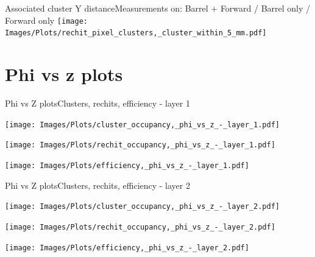 \documentclass{beamer}
\begin{document}
\begin{frame}{Associated cluster Y distance}{Measurements on: Barrel + Forward / Barrel only / Forward only}
  \centering
  \texttt{[image: Images/Plots/rechit\_pixel\_clusters,\_cluster\_within\_5\_mm.pdf]}
\end{frame}

\section{Phi vs z plots}

\begin{frame}{Phi vs Z plots}{Clusters, rechits, efficiency - layer 1}
  \hspace{0.01\textwidth}%
  \begin{minipage}{0.32\textwidth}
    \centering
    \texttt{[image: Images/Plots/cluster\_occupancy,\_phi\_vs\_z\_-\_layer\_1.pdf]}
  \end{minipage}%
  \hspace{0.01\textwidth}%
  \begin{minipage}{0.32\textwidth}
    \centering
    \texttt{[image: Images/Plots/rechit\_occupancy,\_phi\_vs\_z\_-\_layer\_1.pdf]}
  \end{minipage}
  \vspace*{0.2cm}
  \begin{minipage}{0.32\textwidth}
    \centering
    \texttt{[image: Images/Plots/efficiency,\_phi\_vs\_z\_-\_layer\_1.pdf]}
  \end{minipage}%
\end{frame}

\begin{frame}{Phi vs Z plots}{Clusters, rechits, efficiency - layer 2}
  \hspace{0.01\textwidth}%
  \begin{minipage}{0.32\textwidth}
    \centering
    \texttt{[image: Images/Plots/cluster\_occupancy,\_phi\_vs\_z\_-\_layer\_2.pdf]}
  \end{minipage}%
  \hspace{0.01\textwidth}%
  \begin{minipage}{0.32\textwidth}
    \centering
    \texttt{[image: Images/Plots/rechit\_occupancy,\_phi\_vs\_z\_-\_layer\_2.pdf]}
  \end{minipage}
  \vspace*{0.2cm}
  \begin{minipage}{0.32\textwidth}
    \centering
    \texttt{[image: Images/Plots/efficiency,\_phi\_vs\_z\_-\_layer\_2.pdf]}
  \end{minipage}%
\end{frame}
\end{document}
